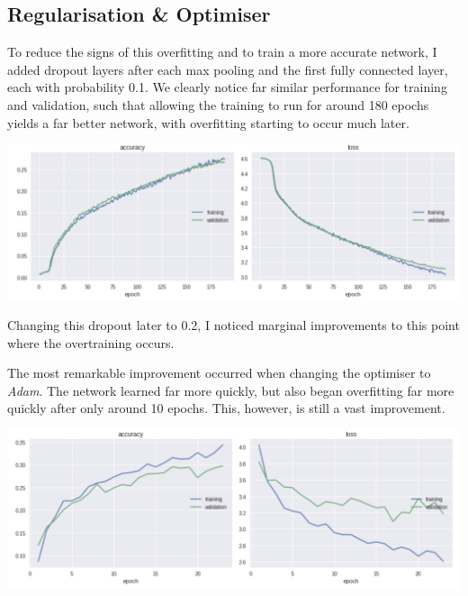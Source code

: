 \documentclass[11pt]{article}
\begin{document}
\subsection{Regularisation \& Optimiser}

To reduce the signs of this overfitting and to train a more accurate network, I added dropout layers after each max pooling and the first fully connected layer, each with probability 0.1. We clearly notice far similar performance for training and validation, such that allowing the training to run for around 180 epochs yields a far better network, with overfitting starting to occur much later. 

    \begin{center}
        \begin{minipage}{0.75\linewidth}
            \includegraphics[width=\linewidth]{accuracy2}
            \label{fig:first-conv}
        \end{minipage}%
    \end{center}

Changing this dropout later to 0.2, I noticed marginal improvements to this point where the overtraining occurs.

The most remarkable improvement occurred when changing the optimiser to \textit{Adam}. The network learned far more quickly, but also began overfitting far more quickly after only around 10 epochs. This, however, is still a vast improvement.


    \begin{center}
        \begin{minipage}{0.75\linewidth}
            \includegraphics[width=\linewidth]{accuracy3}
            \label{fig:first-conv}
        \end{minipage}%
    \end{center}
    
\end{document}
